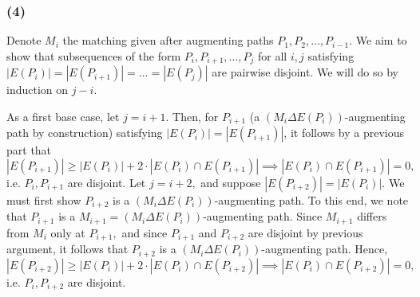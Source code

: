 \documentclass{article}
\begin{document}



  \subsubsection*{(4)} Denote $M_i$ the matching given after augmenting paths $P_1,P_2,\dots, P_{i-1}.$ We aim to show that subsequences of the form $P_i,P_{i+1},\dots,P_{j}$ for all $i,j$ satisfying $|E(P_i)|=|E(P_{i+1})|=\dots=|E(P_j)|$ are pairwise disjoint. We will do so by induction on $j-i.$

  As a first base case, let $j=i+1.$ Then, for $P_{i+1}$ (a $(M_i\Delta E(P_i))$-augmenting path by construction) satisfying $|E(P_i)|=|E(P_{i+1})|$, it follows by a previous part that $$|E(P_{i+1})|\geq |E(P_i)|+2\cdot |E(P_i)\cap E(P_{i+1})|\implies |E(P_i)\cap E(P_{i+1})|=0,$$i.e. $P_i, P_{i+1}$ are disjoint. Let $j=i+2,$ and suppose $|E(P_{i+2})|=|E(P_i)|.$ We must first show $P_{i+2}$ is a $(M_i\Delta E(P_i))$-augmenting path. To this end, we note that $P_{i+1}$ is a $M_{i+1}=(M_i\Delta E(P_i))$-augmenting path. Since $M_{i+1}$ differs from $M_i$ only at $P_{i+1},$ and since $P_{i+1}$ and $P_{i+2}$ are disjoint by previous argument, it follows that $P_{i+2}$ is a $(M_i\Delta E(P_i))$-augmenting path. Hence,
  $$|E(P_{i+2})|\geq |E(P_i)|+2\cdot |E(P_i)\cap E(P_{i+2})|\implies |E(P_i)\cap E(P_{i+2})|=0,$$i.e. $P_i, P_{i+2}$ are disjoint.
\end{document}
